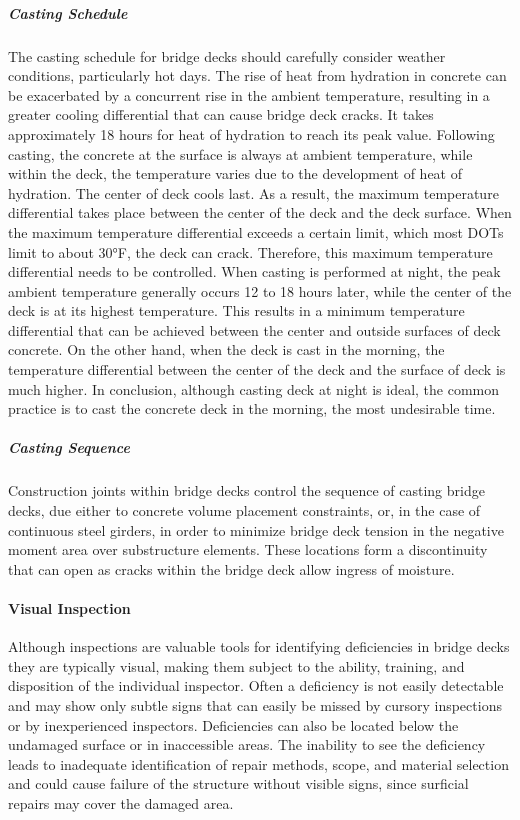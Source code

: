 \subparagraph{Casting Schedule}
The casting schedule for bridge decks should carefully consider weather conditions, particularly hot days. The
rise of heat from hydration in concrete can be exacerbated by a concurrent rise in the ambient temperature, resulting
in a greater cooling differential that can cause bridge deck cracks. It takes approximately 18 hours for heat of
hydration to reach its peak value. Following casting, the concrete at the surface is always at ambient temperature,
while within the deck, the temperature varies due to the development of heat of hydration. The center of deck cools
last. As a result, the maximum temperature differential takes place between the center of the deck and the deck
surface. When the maximum temperature differential exceeds a certain limit, which most DOTs limit to about 30°F,
the deck can crack. Therefore, this maximum temperature differential needs to be controlled. When casting is
performed at night, the peak ambient temperature generally occurs 12 to 18 hours later, while the center of the deck
is at its highest temperature. This results in a minimum temperature differential that can be achieved between the
center and outside surfaces of deck concrete. On the other hand, when the deck is cast in the morning, the
temperature differential between the center of the deck and the surface of deck is much higher. In conclusion,
although casting deck at night is ideal, the common practice is to cast the concrete deck in the morning, the most
undesirable time.

\subparagraph{Casting Sequence}
Construction joints within bridge decks control the sequence of casting bridge decks, due either to concrete
volume placement constraints, or, in the case of continuous steel girders, in order to minimize bridge deck tension in the negative moment area over substructure elements. These locations form a discontinuity that can open as cracks
within the bridge deck allow ingress of moisture.


\paragraph{Visual Inspection}
Although inspections are valuable tools for identifying deficiencies in bridge decks they are typically visual,
making them subject to the ability, training, and disposition of the individual inspector. Often a deficiency is not
easily detectable and may show only subtle signs that can easily be missed by cursory inspections or by
inexperienced inspectors. Deficiencies can also be located below the undamaged surface or in inaccessible areas. The
inability to see the deficiency leads to inadequate identification of repair methods, scope, and material selection and
could cause failure of the structure without visible signs, since surficial repairs may cover the damaged area.

